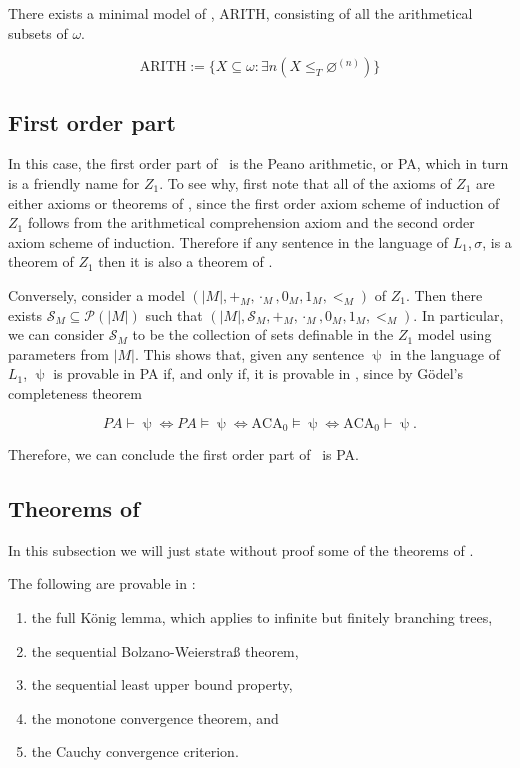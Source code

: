 \documentclass[../main.tex]{memoir}
\begin{document}
\begin{corollary}
  \label{corollary:arith-model}
  There exists a minimal model of \aca, ARITH, consisting of all the arithmetical subsets of $\omega$.

  \[ \text{ARITH} := \{X \subseteq \omega: \exists n (X \le_T \varnothing^{(n)})\} \]
\end{corollary}

\subsection{First order part}

In this case, the first order part of \aca\ is the Peano arithmetic, or PA, which in turn is a friendly name for $Z_1$. To see why, first note that all of the axioms of $Z_1$ are either axioms or theorems of \aca, since the first order axiom scheme of induction of $Z_1$ follows from the arithmetical comprehension axiom and the second order axiom scheme of induction. Therefore if any sentence in the language of $L_1, \sigma$, is a theorem of $Z_1$ then it is also a theorem of \aca.

Conversely, consider a model $(|M|, +_M, \cdot_M, 0_M, 1_M, <_M)$ of $Z_1$. Then there exists $\mathcal{S}_M \subseteq \mathcal{P}(|M|)$ such that $(|M|, \mathcal{S}_M, +_M, \cdot_M, 0_M, 1_M, <_M)$. In particular, we can consider $\mathcal{S}_M$ to be the collection of sets definable in the $Z_1$ model using parameters from $|M|$. This shows that, given any sentence $\uppsi$ in the language of $L_1$, $\uppsi$ is provable in PA if, and only if, it is provable in \aca, since by Gödel's completeness theorem

\[ PA \vdash \uppsi \iff PA \vDash \uppsi \iff \text{ACA}_0 \vDash \uppsi \iff \text{ACA}_0 \vdash \uppsi. \]

Therefore, we can conclude the first order part of \aca\ is PA.

\subsection{Theorems of \aca}

In this subsection we will just state without proof some of the theorems of \aca.

\begin{theorem}
  The following are provable in \aca:

  \begin{enumerate}
  \item the full König lemma, which applies to infinite but finitely branching trees,
  \item the sequential Bolzano-Weierstra{\ss} theorem,
  \item the sequential least upper bound property,
  \item the monotone convergence theorem, and
  \item the Cauchy convergence criterion.
  \end{enumerate}
\end{theorem}
\end{document}
